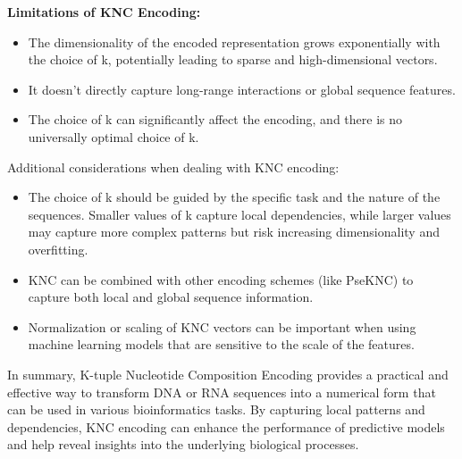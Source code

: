 \noindent
\textbf{Limitations of KNC Encoding:}
\begin{itemize}
  \item The dimensionality of the encoded representation grows exponentially with the choice of k, potentially leading to sparse and high-dimensional vectors.
  \item It doesn't directly capture long-range interactions or global sequence features.
  \item The choice of k can significantly affect the encoding, and there is no universally optimal choice of k.
\end{itemize}

\noindent
Additional considerations when dealing with KNC encoding:

\begin{itemize}
  \item The choice of k should be guided by the specific task and the nature of the sequences. Smaller values of k capture local dependencies, while larger values may capture more complex patterns but risk increasing dimensionality and overfitting.
  \item KNC can be combined with other encoding schemes (like PseKNC) to capture both local and global sequence information.
  \item Normalization or scaling of KNC vectors can be important when using machine learning models that are sensitive to the scale of the features.
\end{itemize}

\noindent
In summary, K-tuple Nucleotide Composition Encoding provides a practical and effective way to transform DNA or RNA sequences into a numerical form that can be used in various bioinformatics tasks. By capturing local patterns and dependencies, KNC encoding can enhance the performance of predictive models and help reveal insights into the underlying biological processes.